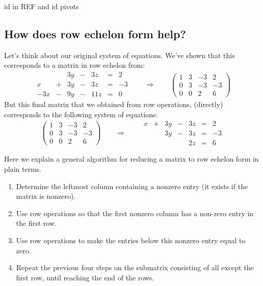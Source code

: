\documentclass{ximera}
\begin{document}
\begin{question}
  id in REF and id pivots
\end{question}



\subsection{How does row echelon form help?}

Let's think about our original system of equations. We've shown that
this corresponds to a matrix in row echelon from:
\[
\begin{array}{ccccccc}
       & & 3y &-& 3z &=& 2 \\
     x& +&3y&-&3z&=&-3\\
     -3x& -&9y&-&11z&=&0
\end{array}
\qquad\Longrightarrow\qquad
\begin{pmatrix}
  1 &   3 & -3 & 2  \\
  0 &   3 & -3 & -3 \\
  0& 0  & 2 & 6
\end{pmatrix}
\]
But this final matrix that we obtained from row operations, (directly)
corresponds to the following system of equations:
\[
\left(\begin{array}{ccc|c}
  1 &   3 & -3 & 2  \\
  0 &   3 & -3 & -3 \\
  0& 0  & 2 & 6
\end{array}\right)
\qquad\Longrightarrow\qquad
\begin{array}{ccccccc}
     x  &+ & 3y &-& 3z &=& 2 \\
     &  &3y&-&3z&=&-3\\
     & & & &2z&=&6
\end{array}
\]



\begin{algorithm}
  Here we explain a general algorithm for reducing a matrix to row
  echelon form in plain terms.
  \begin{enumerate}
  \item Determine the leftmost column containing a nonzero entry (it exists if the matrix is nonzero).
  \item Use row operations so that the first nonzero column has a non-zero entry in the first row.
  \item Use row operations to make the entries below this nonzero entry equal to zero.
  \item Repeat the previous four steps on the submatrix consisting of
    all except the first row, until reaching the end of the rows.
  \end{enumerate}
\end{algorithm}
\end{document}
